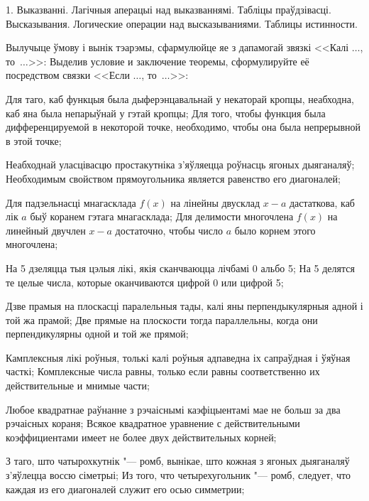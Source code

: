 



\biLangHeader
{1. Выказванні. Лагічныя аперацыі над выказваннямі. Табліцы праўдзівасці.}
{Высказывания. Логические операции над высказываниями. Таблицы истинности.}

\begin{problemList}

\problemItemSimple
{Вылучыце ўмову і вынік тэарэмы, сфармулюйце яе з дапамогай звязкі <<Калі $\ldots$, то~$\ldots$>>:}
{Выделив условие и заключение теоремы, сформулируйте её посредством связки <<Если $\ldots$, то~$\ldots$>>:}

\begin{belarusianEnumerate}

\problemItemSimple
{Для таго, каб функцыя была дыферэнцавальнай у некаторай кропцы, неабходна, каб яна была непарыўнай у гэтай кропцы;}
{Для того, чтобы функция была дифференцируемой в некоторой точке, необходимо, чтобы она была непрерывной в этой точке;}

\problemItemSimple
{Неабходнай уласцівасцю простакутніка з'яўляецца роўнасць ягоных дыяганаляў;}
{Необходимым свойством прямоугольника является равенство его диагоналей;}

\problemItemSimple
{Для падзельнасці мнагасклада $f(x)$ на лінейны двусклад $x - a$ дастаткова, каб лік $a$ быў коранем гэтага мнагасклада;}
{Для делимости многочлена $f(x)$ на линейный двучлен $x - a$ достаточно, чтобы число $a$ было корнем этого многочлена;}

\problemItemSimple
{На 5 дзеляцца тыя цэлыя лікі, якія сканчваюцца лічбамі 0 альбо 5;}
{На 5 делятся те целые числа, которые оканчиваются цифрой 0 или цифрой 5;}

\problemItemSimple
{Дзве прамыя на плоскасці паралельныя тады, калі яны перпендыкулярныя адной і той жа прамой;}
{Две прямые на плоскости тогда параллельны, когда они перпендикулярны одной и той же прямой;}

\problemItemSimple
{Камплексныя лікі роўныя, толькі калі роўныя адпаведна іх сапраўдная і ўяўная часткі;}
{Комплексные числа равны, только если равны соответственно их действительные и мнимые части;}

\problemItemSimple
{Любое квадратнае раўнанне з рэчаіснымі каэфіцыентамі мае не больш за два рэчаісных кораня;}
{Всякое квадратное уравнение с действительными коэффициентами имеет не более двух действительных корней;}

\problemItemSimple
{З таго, што чатырохкутнік "--- ромб, вынікае, што кожная з ягоных дыяганаляў з'яўлецца воссю сіметрыі;}
{Из того, что четырехугольник "--- ромб, следует, что каждая из его диагоналей служит его осью симметрии;}


\end{belarusianEnumerate}
\end{problemList}
